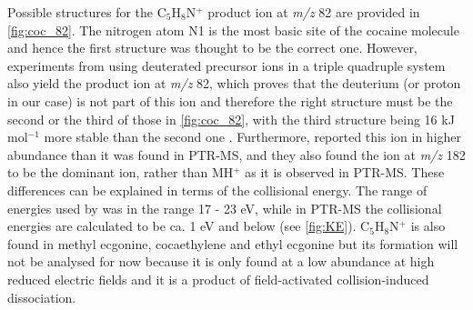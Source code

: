 Possible structures for the C$_5$H$_8$N$^+$ product ion at \textit{m/z} 82 are provided in \autoref{fig:coc_82}. 
%
The nitrogen atom N1 is the most basic site of the cocaine molecule and hence the first structure was thought to be the correct one.
%
However, experiments from \citeauthor{wang1998collision} using deuterated precursor ions in a triple quadruple system also yield the product ion at \textit{m/z} 82, which proves that the deuterium (or proton in our case) is not part of this ion and therefore the right structure must be the second or the third of those in \autoref{fig:coc_82}, with the third structure being 16 kJ mol$^{-1}$ more stable than the second one \cite{wang1998collision}.
%
Furthermore, \citeauthor{wang1998collision} reported this ion in higher abundance than it was found in PTR-MS, and they also found the ion at \textit{m/z} 182 to be the dominant ion, rather than MH$^+$ as it is observed in PTR-MS. These differences can be explained in terms of the collisional energy. The range of energies used by \citeauthor{wang1998collision} was in the range 17 - 23 eV, while in PTR-MS the collisional energies are calculated to be ca. 1 eV and below (see \autoref{fig:KE}).
%
C$_5$H$_8$N$^+$ is also found in methyl ecgonine, cocaethylene and ethyl ecgonine but its formation will not be analysed for now because it is only found at a low abundance at high reduced electric fields and it is a product of field-activated collision-induced dissociation.







